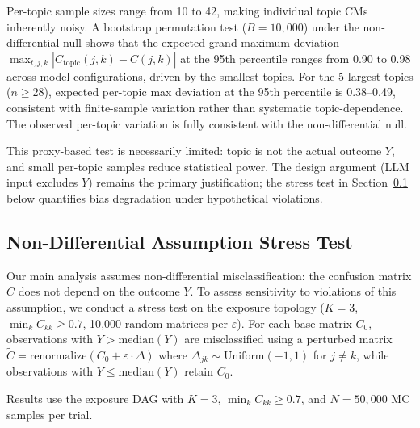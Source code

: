 Per-topic sample sizes range from 10 to 42, making individual topic CMs inherently noisy. A bootstrap permutation test ($B{=}10{,}000$) under the non-differential null shows that the expected grand maximum deviation $\max_{t,j,k} |C_{\text{topic}}(j,k) - C(j,k)|$ at the 95th percentile ranges from 0.90 to 0.98 across model configurations, driven by the smallest topics. For the 5 largest topics ($n \geq 28$), expected per-topic max deviation at the 95th percentile is 0.38--0.49, consistent with finite-sample variation rather than systematic topic-dependence. The observed per-topic variation is fully consistent with the non-differential null.

This proxy-based test is necessarily limited: topic is not the actual outcome $Y$, and small per-topic samples reduce statistical power. The design argument (LLM input excludes $Y$) remains the primary justification; the stress test in Section~\ref{sec:nondiff_stress} below quantifies bias degradation under hypothetical violations.

\subsection{Non-Differential Assumption Stress Test}
\label{sec:nondiff_stress}

Our main analysis assumes non-differential misclassification: the confusion matrix $C$ does not depend on the outcome $Y$. To assess sensitivity to violations of this assumption, we conduct a stress test on the exposure topology ($K{=}3$, $\min_k C_{kk} \geq 0.7$, 10{,}000 random matrices per $\varepsilon$). For each base matrix $C_0$, observations with $Y > \text{median}(Y)$ are misclassified using a perturbed matrix $\tilde{C} = \text{renormalize}(C_0 + \varepsilon \cdot \Delta)$ where $\Delta_{jk} \sim \text{Uniform}(-1,1)$ for $j \neq k$, while observations with $Y \leq \text{median}(Y)$ retain $C_0$.

Results use the exposure DAG with $K{=}3$, $\min_k C_{kk} \geq 0.7$, and $N{=}50{,}000$ MC samples per trial.

\begin{table}[H]
\centering
\small
\caption{Effect of differential misclassification on bias violation rates.}
\label{tab:nondiff_stress}
\end{table}

